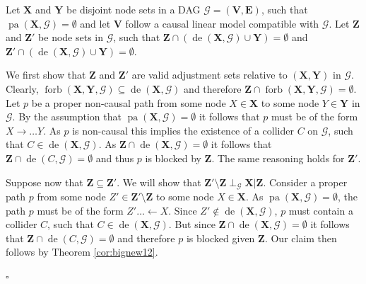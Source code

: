 \documentclass[11pt,a4paper]{article}
\theoremstyle{definition}
\theoremstyle{remark}
\newenvironment{proofof}[1][]{\begin{trivlist}
\item[\hskip \labelsep {\textit{Proof of #1.}}]}{\hfill{}$\square$\end{trivlist}}
\DeclareMathOperator{\Forbb}{forb}
\DeclareMathOperator{\pa}{pa}
\DeclareMathOperator{\de}{de}
\newcommand{\g}[1][G]{\mathcal{#1}}
\newcommand{\fb}[2][X,Y]{\Forbb(\mathbf{#1},#2)}
\begin{document}
\begin{proofof}[Corollary \ref{cor:pretreatment}]
	Let $\mathbf{X}$ and $\mathbf{Y}$ be disjoint node sets in a DAG $\g = (\mathbf{V},\mathbf{E})$, such that $\pa(\mathbf{X},\g)=\emptyset$ and let $\mathbf{V}$ follow a causal linear model compatible with $\g$. Let $\mathbf{Z}$ and $\mathbf{Z'}$ be node sets in $\g$, such that $\mathbf{Z} \cap (\de(\mathbf{X},\g)\cup\mathbf{Y}) = \emptyset$ and $\mathbf{Z'} \cap (\de(\mathbf{X},\g)\cup\mathbf{Y}) = \emptyset$. 
	
	We first show that $\mathbf{Z}$ and $\mathbf{Z'}$ are valid adjustment sets relative to $(\mathbf{X},\mathbf{Y})$ in $\g$. Clearly, $\fb{\g} \subseteq \de(\mathbf{X},\g)$ and therefore $\mathbf{Z} \cap \fb{\g} = \emptyset$. Let $p$ be a proper non-causal path from some node $X\in\mathbf{X}$ to some node $Y\in\mathbf{Y}$ in $\g$. By the assumption that $\pa(\mathbf{X},\g)=\emptyset$ it follows that $p$ must be of the form $X \rightarrow \dots Y$. As $p$ is non-causal this implies the existence of a collider $C$ on $\g$, such that $C \in \de(\mathbf{X},\g)$. As $\mathbf{Z} \cap \de(\mathbf{X},\g) = \emptyset$ it follows that $\mathbf{Z} \cap \de(C,\g)=\emptyset$ and thus $p$ is blocked by $\mathbf{Z}$. The same reasoning holds for $\mathbf{Z'}$.
	
Suppose now that $\mathbf{Z} \subseteq \mathbf{Z'}$. We will show that $\mathbf{Z'}\setminus \mathbf{Z} \perp_{\g} \mathbf{X} | \mathbf{Z}$. 
Consider a proper path $p$ from some node $Z' \in \mathbf{Z'}\setminus \mathbf{Z}$ to some node $X\in\mathbf{X}$. As $\pa(\mathbf{X},\g)=\emptyset$, the path $p$ must be of the form $Z' \dots \leftarrow X$. Since $Z'\notin \de(\mathbf{X},\g)$, $p$ must contain a collider $C$, such that $C \in \de(\mathbf{X},\g)$. But since $\mathbf{Z}\cap\de(\mathbf{X},\g)=\emptyset$ it follows that $\mathbf{Z} \cap \de(C,\g)=\emptyset$ and therefore $p$ is blocked given $\mathbf{Z}$. Our claim then follows by Theorem \ref{cor:bignew12}.
	
	
\end{proofof}

\end{document}
